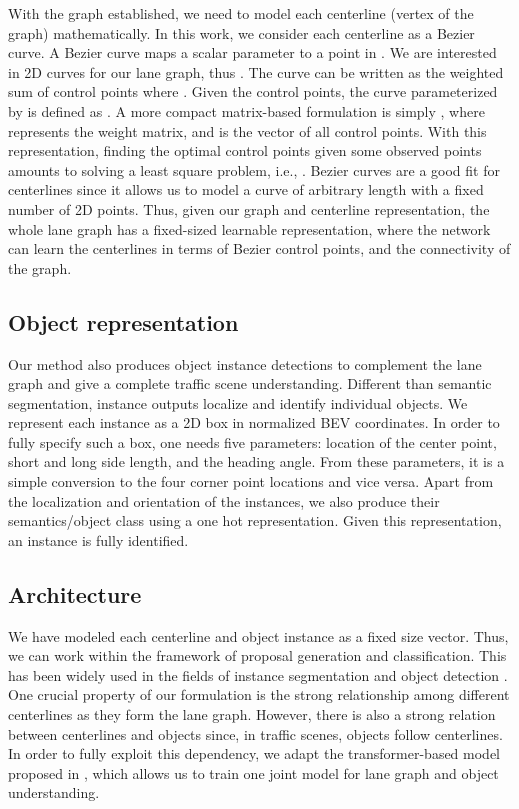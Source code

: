 \documentclass[10pt,twocolumn,letterpaper]{article}
\begin{document}
With the graph established, we need to model each centerline (vertex of the graph) mathematically. In this work, we consider each centerline as a Bezier curve. A Bezier curve maps a scalar parameter  to a point in . We are interested in 2D curves for our lane graph, thus . The curve can be written as the weighted sum of control points  where . Given the control points, the curve  parameterized by  is defined as . A more compact matrix-based formulation is simply , where  represents the weight matrix, and  is the vector of all control points. With this representation, finding the optimal control points given some observed points  amounts to solving a least square problem, i.e., . 
Bezier curves are a good fit for centerlines since it allows us to model a curve of arbitrary length with a fixed number of 2D points.
Thus, given our graph and centerline representation, the whole lane graph has a fixed-sized learnable representation, where the network can learn the centerlines in terms of Bezier control points, and the connectivity of the graph.

\subsection{Object representation}
Our method also produces object instance detections to complement the lane graph and give a complete traffic scene understanding. Different than semantic segmentation, instance outputs localize and identify individual objects. We represent each instance as a 2D box in normalized BEV coordinates. In order to fully specify such a box, one needs five parameters: location of the center point, short and long side length, and the heading angle. 
From these parameters, it is a simple conversion to the four corner point locations and vice versa. Apart from the localization and orientation of the instances, we also produce their semantics/object class using a one hot representation. Given this representation, an instance is fully identified. 





\subsection{Architecture}
We have modeled each centerline and object instance as a fixed size vector. Thus, we can work within the framework of proposal generation and classification. This has been widely used in the fields of instance segmentation and object detection \cite{DBLP:journals/pami/RenHG017, he2017, DBLP:conf/eccv/CarionMSUKZ20}. One crucial property of our formulation is the strong relationship among different centerlines as they form the lane graph. However, there is also a strong relation between centerlines and objects since, in traffic scenes, objects follow centerlines. In order to fully exploit this dependency, we adapt the transformer-based model proposed in \cite{DBLP:conf/eccv/CarionMSUKZ20}, which allows us to train one joint model for lane graph and object understanding. 
\end{document}
